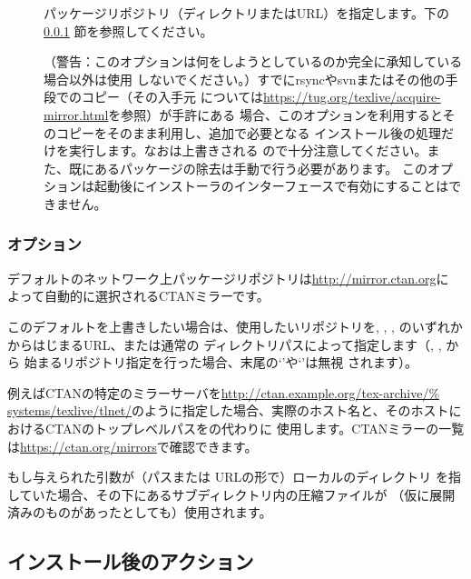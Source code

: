 \documentclass[uplatex,dvipdfmx,12pt,tombow]{jsarticle}
\begin{document}
\begin{description}
\item[]
パッケージリポジトリ（ディレクトリまたはURL）を指定します。下の\ref{sec:location}%
節を参照してください。

\item[]
（警告：このオプションは何をしようとしているのか完全に承知している場合以外は使用
しないでください。）すでにrsyncやsvnまたはその他の手段で\TL のコピー（その入手元
については\url{https://tug.org/texlive/acquire-mirror.html}を参照）が手許にある
場合、このオプションを利用するとそのコピーをそのまま利用し、追加で必要となる
インストール後の処理だけを実行します。なおは上書きされる
ので十分注意してください。また、既にあるパッケージの除去は手動で行う必要があります。
このオプションは起動後にインストーラのインターフェースで有効にすることはできません。
\end{description}

\subsubsection{オプション}
\label{sec:location}

デフォルトのネットワーク上パッケージリポジトリは\url{http://mirror.ctan.org}に
よって自動的に選択されるCTANミラーです。

このデフォルトを上書きしたい場合は、使用したいリポジトリを, , , のいずれかからはじまるURL、または通常の
ディレクトリパスによって指定します（, , から
始まるリポジトリ指定を行った場合、末尾の`\code{/}'や`'は無視
されます）。

例えばCTANの特定のミラーサーバを\url{http://ctan.example.org/tex-archive/%
systems/texlive/tlnet/}のように指定した場合、実際のホスト名と、そのホストに
おけるCTANのトップレベルパスをの代わりに
使用します。CTANミラーの一覧は\url{https://ctan.org/mirrors}で確認できます。

もし与えられた引数が（パスまたは URLの形で）ローカルのディレクトリ
を指していた場合、その下にあるサブディレクトリ内の圧縮ファイルが
（仮に展開済みのものがあったとしても）使用されます。

\subsection{インストール後のアクション}
\label{sec:postinstall}
\end{document}
